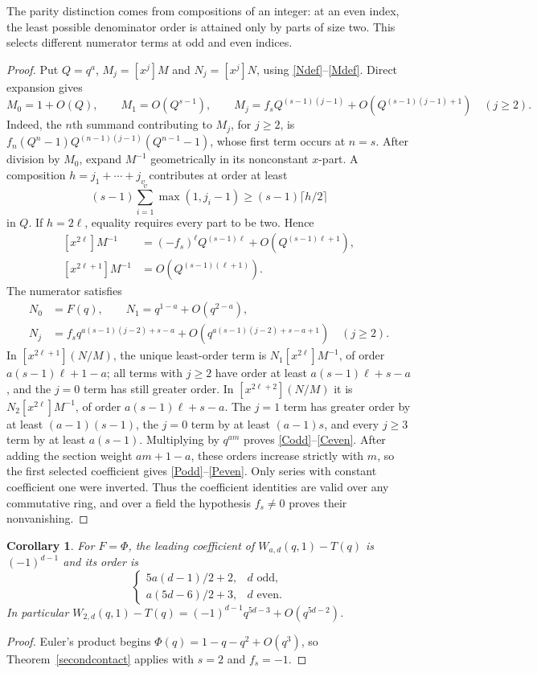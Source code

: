 \documentclass[11pt]{amsart}
\newtheorem{corollary}[theorem]{Corollary}
\theoremstyle{definition}
\theoremstyle{remark}
\numberwithin{equation}{section}
\begin{document}
The parity distinction comes from compositions of an integer: at an even
index, the least possible denominator order is attained only by parts of size
two. This selects different numerator terms at odd and even indices.
\begin{proof}
Put $Q=q^a$, $M_j=[x^j]M$ and $N_j=[x^j]N$, using
\eqref{Ndef}--\eqref{Mdef}. Direct expansion gives
\[
 M_0=1+O(Q),\qquad M_1=O(Q^{s-1}),\qquad
 M_j=f_sQ^{(s-1)(j-1)}+O(Q^{(s-1)(j-1)+1})\quad(j\ge2).
\]
Indeed, the $n$th summand contributing to $M_j$, for $j\ge2$, is
$f_n(Q^n-1)Q^{(n-1)(j-1)}(Q^{n-1}-1)$, whose first term occurs at $n=s$.
After division by $M_0$, expand $M^{-1}$ geometrically in its nonconstant
$x$-part. A composition $h=j_1+\cdots+j_v$ contributes at order at least
\[
 (s-1)\sum_{i=1}^v\max(1,j_i-1)\ge(s-1)\lceil h/2\rceil
\]
in $Q$. If $h=2\ell$, equality requires every part to be two. Hence
\begin{equation}\label{Minverse}
 \begin{aligned}
 [x^{2\ell}]M^{-1}
   &=(-f_s)^\ell Q^{(s-1)\ell}+O(Q^{(s-1)\ell+1}),\\
 [x^{2\ell+1}]M^{-1}&=O(Q^{(s-1)(\ell+1)}).
 \end{aligned}
\end{equation}
The numerator satisfies
\begin{align*}
 N_0&=F(q),\qquad N_1=q^{1-a}+O(q^{2-a}),\\
 N_j&=f_s q^{a(s-1)(j-2)+s-a}
       +O(q^{a(s-1)(j-2)+s-a+1})\quad(j\ge2).
\end{align*}
In $[x^{2\ell+1}](N/M)$, the unique least-order term is
$N_1[x^{2\ell}]M^{-1}$, of order $a(s-1)\ell+1-a$; all terms with
$j\ge2$ have order at least $a(s-1)\ell+s-a$, and the $j=0$ term has
still greater order. In $[x^{2\ell+2}](N/M)$ it is
$N_2[x^{2\ell}]M^{-1}$, of order $a(s-1)\ell+s-a$.
The $j=1$ term has greater order by at least $(a-1)(s-1)$, the $j=0$
term by at least $(a-1)s$, and every $j\ge3$ term by at least $a(s-1)$.
Multiplying by $q^{am}$ proves \eqref{Codd}--\eqref{Ceven}.
After adding the section weight $am+1-a$, these orders increase strictly
with $m$, so the first selected coefficient gives \eqref{Podd}--\eqref{Peven}.
Only series with constant coefficient one were inverted. Thus the coefficient
identities are valid over any commutative ring, and over a field the
hypothesis $f_s\ne0$ proves their nonvanishing.
\end{proof}

\begin{corollary}\label{PhiSecond}
For $F=\Phi$, the leading coefficient of $W_{a,d}(q,1)-T(q)$ is $(-1)^{d-1}$ and its order is
\[
 \begin{cases}
 5a(d-1)/2+2,&d\text{ odd},\\
 a(5d-6)/2+3,&d\text{ even}.
 \end{cases}
\]
In particular $W_{2,d}(q,1)-T(q)=(-1)^{d-1}q^{5d-3}+O(q^{5d-2})$.
\end{corollary}
\begin{proof}
Euler's product begins $\Phi(q)=1-q-q^2+O(q^3)$, so Theorem~\ref{secondcontact} applies with $s=2$ and $f_s=-1$.
\end{proof}
\end{document}
